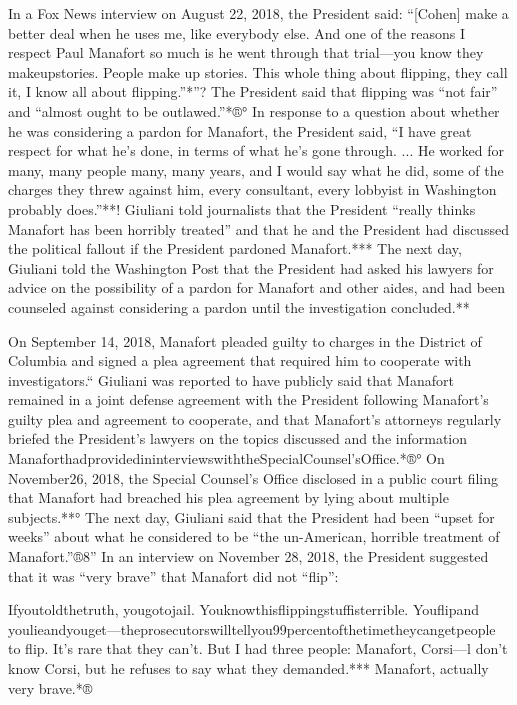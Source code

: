 In a Fox News interview on August 22, 2018, the President said: “[Cohen] make a better deal when he uses me, like everybody else. And one of the reasons I respect Paul Manafort so much is he went through that trial—you know they makeupstories. People make up stories. This whole thing about flipping, they call it, I know all about flipping.”*”? The President said that flipping was “not fair” and “almost ought to be outlawed.”*®° In response to a question about whether he was considering a pardon for Manafort, the President said, “I have great respect for what he's done, in terms of what he's gone through. ... He worked for many, many people many, many years, and I would say what he did, some of the charges they threw against him, every consultant, every lobbyist in Washington probably does.”**! Giuliani told journalists that the President “really thinks Manafort has been horribly treated” and that he and the President had discussed the political fallout if the President pardoned Manafort.*** The next day, Giuliani told the Washington Post that the President had asked his lawyers for advice on the possibility of a pardon for Manafort and other aides, and had been counseled against considering a pardon until the investigation concluded.**

On September 14, 2018, Manafort pleaded guilty to charges in the District of Columbia and signed a plea agreement that required him to cooperate with investigators.“ Giuliani was reported to have publicly said that Manafort remained in a joint defense agreement with the President following Manafort's guilty plea and agreement to cooperate, and that Manafort's attorneys regularly briefed the President's lawyers on the topics discussed and the information ManaforthadprovidedininterviewswiththeSpecialCounsel'sOffice.*®° On November26, 2018, the Special Counsel's Office disclosed in a public court filing that Manafort had breached his plea agreement by lying about multiple subjects.**° The next day, Giuliani said that the President had been “upset for weeks” about what he considered to be “the un-American, horrible treatment of Manafort.”®8” In an interview on November 28, 2018, the President suggested that it was “very brave” that Manafort did not “flip”:

Ifyoutoldthetruth, yougotojail. Youknowthisflippingstuffisterrible. Youflipand youlieandyouget—theprosecutorswilltellyou99percentofthetimetheycangetpeople to flip. It's rare that they can't. But I had three people: Manafort, Corsi—l don't know
Corsi, but he refuses to say what they demanded.*** Manafort, actually very brave.*®

